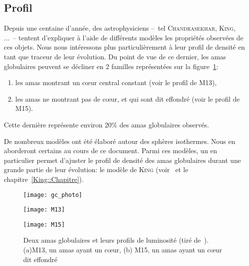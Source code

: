 		\subsection{Profil}
			Depuis une centaine d'année, des astrophysiciens --~tel \textsc{Chandrasekhar}, \textsc{King}, ...~--
			tentent d'expliquer à l'aide de différents modèles les propriétés observées de ces objets.
			Nous nous intéressons plus particulièrement à leur profil de densité en tant que traceur de leur évolution.
			Du point de vue de ce dernier, les amas globulaires peuvent se décliner en 2 familles représentées sur la
			figure~\ref{Fig::Intro::images}:
			\begin{enumerate}
				\item les amas montrant un cœur central constant (voir le profil de
					M13),
				\item les amas ne montrant pas de cœur, et qui sont dit effondré (voir le profil de M15).
			\end{enumerate}
			Cette dernière représente environ 20\% des amas globulaires observés.

			De nombreux modèles ont été élaboré autour des sphères isothermes. Nous en
			aborderont certains au cours de ce document. Parmi ces modèles, un en particulier
			permet d'ajuster le profil de densité des amas globulaires durant une grande
			partie de leur évolution: le modèle de \textsc{King}
			(voir~\cite{1966AJ.....71...64K} et le chapitre~\ref{King::Chapitre}).


			\begin{figure}
				\begin{center}
					\texttt{[image: gc\_photo]}
				\end{center}
				\begin{minipage}{0.45\textwidth}
					\begin{center}
						\texttt{[image: M13]}
					\end{center}
				\end{minipage}\hfill
				\begin{minipage}{0.45\textwidth}
					\begin{center}
						\texttt{[image: M15]}
					\end{center}
				\end{minipage}
				\caption{\label{Fig::Intro::images}Deux amas globulaires et leurs profils de luminosité (tiré de~\cite{2010A&A...522A..71J}). (a)M13, un amas ayant un cœur, (b) M15, un amas ayant un cœur dit effondré}
			\end{figure}

